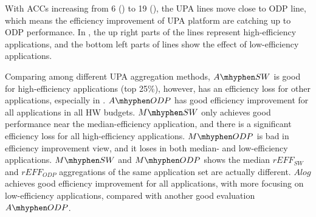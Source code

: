 


With ACCs increasing from 6 () to 19 (), the UPA lines move close to ODP line, which means the efficiency improvement of UPA platform are catching up to ODP performance. 
In , the up right parts of the lines represent high-efficiency applications, and the bottom left parts of lines show the effect of low-efficiency applications. 





Comparing among different UPA aggregation methods, 
$A\mhyphen SW$ is good for high-efficiency applications (top 25\%), however, has an efficiency loss for other applications, especially in .
$A\mhyphen ODP$ has good efficiency improvement for all applications in all HW budgets.
$M\mhyphen SW$ only achieves good performance near the median-efficiency application, and there is a significant efficiency loss for all high-efficiency applications. 
$M\mhyphen ODP$ is bad in efficiency improvement view, and it loses in both median- and low-efficiency applications. 
$M\mhyphen SW$ and $M\mhyphen ODP$ shows the median $rEFF_{SW}$ and $rEFF_{ODP}$ aggregations of the same application set are actually different. 
$Alog$ achieves good efficiency improvement for all applications, with more focusing on low-efficiency applications, compared with another good evaluation $A\mhyphen ODP$.